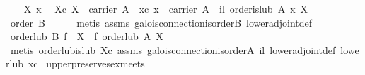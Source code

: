 \begin{isabellebody}
\isamarkupfalse%
\isanewline
\ \ \isamarkupfalse%
\ X\ x\ \isamarkupfalse%
\ Xc{}\ {}X\ {}\ carrier\ A{}\ \ xc{}\ {}x\ {}\ carrier\ A{}\ \ il{}\ {}order{}is{}lub\ A\ x\ X{}\isanewline
\ \ \isamarkupfalse%
\ {}order\ B{}\isanewline
\ \ \ \ \isamarkupfalse%
\ {}metis\ assms\ galois{}connection{}is{}order{}B\ lower{}adjoint{}def{}\isanewline
\ \ \isamarkupfalse%
\ {}order{}lub\ B\ {}f\ {}\ X{}\ {}\ f\ {}order{}lub\ A\ X{}{}\isanewline
\ \ \ \ \isamarkupfalse%
\ {}metis\ order{}lub{}is{}lub\ Xc\ assms\ galois{}connection{}is{}order{}A\ il\ lower{}adjoint{}def\ lower{}lub\ xc{}\isanewline
{}\isamarkupfalse%
%
\endisatagproof
{\isafoldproof}%
%
\isadelimproof
\isanewline
%
\endisadelimproof
\isanewline
{}\isamarkupfalse%
\ upper{}preserves{}ex{}meets{}\isanewline

\end{isabellebody}
